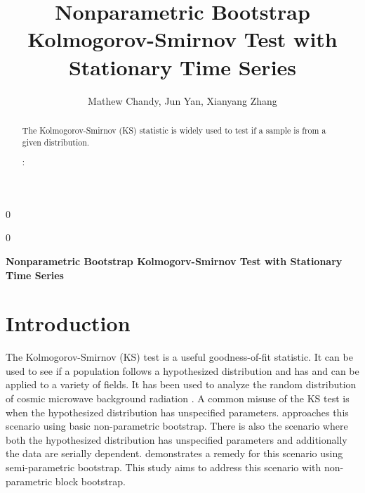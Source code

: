 \documentclass[12pt, letterpaper]{article}
\newcommand{\blind}{0}
\begin{document}

\blind
{
  \title{\bf Nonparametric Bootstrap Kolmogorov-Smirnov Test with Stationary 
  Time Series}
  \author{Mathew Chandy, %
  Jun Yan, %
  Xianyang Zhang\\
}
\date{}
  \maketitle
} \fi

\blind
{
  \bigskip
  \bigskip
  \bigskip
  \begin{center}
    {\LARGE\bf Nonparametric Bootstrap Kolmogorv-Smirnov Test with Stationary 
    Time Series}
\end{center}
  \bigskip
} \fi


\doublespace

\begin{abstract}

The Kolmogorov-Smirnov (KS) statistic is widely used to test if a sample is
from a given distribution.

\bigskip
{}:
\end{abstract}



\section{Introduction}
\label{sec:intro}

The Kolmogorov-Smirnov (KS) test is a useful goodness-of-fit statistic. It 
can be used to see if a population follows a hypothesized distribution and has 
and can be applied to a variety of fields. It has
been used to analyze the random distribution of cosmic microwave background 
radiation \citep{naess2012application}. A common misuse of the KS test is when
the hypothesized distribution has unspecified parameters. 
\citet{babu2004goodness} approaches this scenario using basic 
non-parametric bootstrap. There is also the scenario where both the hypothesized 
distribution has unspecified parameters and additionally the data are 
serially dependent. \citet{zeimbekakis2022misuses} demonstrates a remedy for
this scenario using semi-parametric bootstrap. This study aims to address this
scenario with non-parametric block bootstrap.
\end{document}
